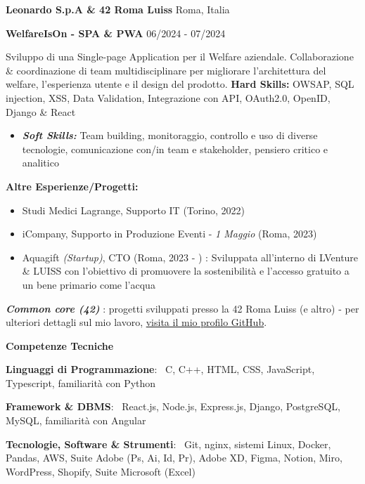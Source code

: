 \documentclass[11pt]{article}
\begin{document}
\vspace{12pt}

\textbf{Leonardo S.p.A \&  42 Roma Luiss} \hfill Roma, Italia

\textbf{WelfareIsOn - SPA \& PWA } \hfill 06/2024 - 07/2024

Sviluppo di una Single-page Application per il Welfare aziendale. Collaborazione \& coordinazione di team multidisciplinare per migliorare l'architettura del welfare, l'esperienza utente e il design del prodotto.
\textbf{Hard Skills:} OWSAP, SQL injection, XSS, Data Validation, Integrazione con API, OAuth2.0, OpenID, Django \& React
\begin{itemize}
    \item \textbf{\textit{Soft Skills:}} Team building, monitoraggio, controllo e uso di diverse tecnologie, comunicazione con/in team e stakeholder, pensiero critico e analitico
\end{itemize}

\vspace{12pt}

\textbf{Altre Esperienze/Progetti:}
\begin{itemize}[noitemsep,topsep=0pt]
    \item Studi Medici Lagrange, Supporto IT (Torino, 2022)
    \item iCompany, Supporto in Produzione Eventi - \textit{1 Maggio} (Roma, 2023)
    \item Aquagift \textit{(Startup)}, CTO (Roma, 2023 - ) : Sviluppata all'interno di LVenture \& LUISS con l'obiettivo di promuovere la sostenibilità e l'accesso gratuito a un bene primario come l'acqua
    \end{itemize}

\textit{\textbf{Common core (42)}} : progetti sviluppati presso la 42 Roma Luiss (e altro) - per ulteriori dettagli sul mio lavoro, \href{https://github.com/amema42}{visita il mio profilo GitHub}.

\vspace{12pt}

\begin{center}
    \textbf{Competenze Tecniche}
\end{center}

\textbf{Linguaggi di Programmazione}: \
C, C++, HTML, CSS, JavaScript, Typescript, familiarità con Python

\textbf{Framework \& DBMS}: \
React.js, Node.js, Express.js, Django, PostgreSQL, MySQL, familiarità con Angular

\textbf{Tecnologie, Software \& Strumenti}: \
Git, nginx, sistemi Linux, Docker, Pandas, AWS, Suite Adobe (Ps, Ai, Id, Pr), Adobe XD, Figma, Notion, Miro, WordPress, Shopify, Suite Microsoft (Excel)
\end{document}
